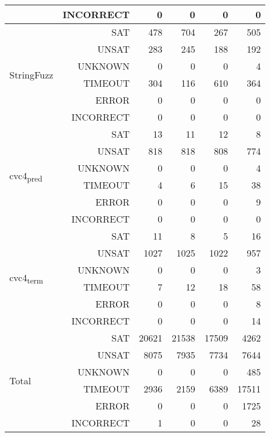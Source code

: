 \documentclass[12pt]{article}
\begin{document}
\begin{table}[h]
{\begin{tabular}{|l r | r r r r |}
							& INCORRECT&     0&     0&     0&     0 \\ \hline
\multirow{6}{*}{StringFuzz}	& SAT      &   478&   704&   267&   505 \\
							& UNSAT    &   283&   245&   188&   192 \\
							& UNKNOWN  &     0&     0&     0&     4 \\
							& TIMEOUT  &   304&   116&   610&   364 \\
							& ERROR    &     0&     0&     0&     0 \\
							& INCORRECT&     0&     0&     0&     0 \\\hline
\multirow{6}{*}{cvc4\textsubscript{pred}} & SAT &    13&    11&    12&     8 \\
							& UNSAT    &   818&   818&   808&   774 \\
							& UNKNOWN  &     0&     0&     0&     4 \\
							& TIMEOUT  &     4&     6&    15&    38 \\
							& ERROR    &     0&     0&     0&     9 \\
							& INCORRECT&     0&     0&     0&     0 \\ \hline
\multirow{6}{*}{cvc4\textsubscript{term}} & SAT &    11&     8&     5&    16 \\
							& UNSAT    &  1027&  1025&  1022&   957 \\
							& UNKNOWN  &     0&     0&     0&     3 \\
							& TIMEOUT  &     7&    12&    18&    58 \\
							& ERROR    &     0&     0&     0&     8 \\
							& INCORRECT&     0&     0&     0&    14 \\ \hline \hline
\multirow{6}{*}{Total} 		& SAT      & 20621& 21538& 17509&  4262 \\
							& UNSAT    &  8075&  7935&  7734&  7644 \\
							& UNKNOWN  &     0&     0&     0&   485 \\
							& TIMEOUT  &  2936&  2159&  6389& 17511 \\
							& ERROR    &     0&     0&     0&  1725 \\
							& INCORRECT&     1&     0&     0&    28 \\\hline	
\end{tabular}}
\label{table:base_benchmark}
\end{table}
\end{document}
